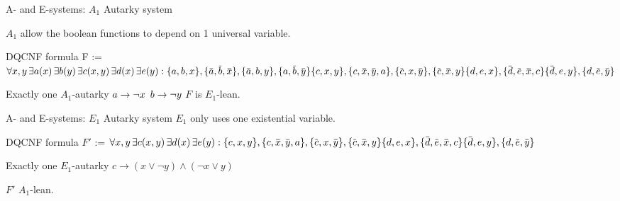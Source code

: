 \documentclass[xcolor=table	]{beamer}
\newcommand{\ov}[1]{\mkern 1.5mu\overline{\mkern-1.5mu#1\mkern-1.5mu}\mkern 1.5mu}
\begin{document}
\begin{frame}{A- and E-systems: $A_1$ Autarky system}

\vspace{0.2cm}
\only
 $A_1$ allow the boolean functions to  
	depend on 1 universal variable. 
	
	\begin{alertblock}{DQCNF formula}
		{		
		F :=	$ \forall x, y \, \exists a(x) \, \exists  b(y) \, \exists c(x,y) \, \exists d(x) \, \exists e(y) :
			\{a,b,x\}, \{\ov{a},\ov{b},\ov{x}\}, \{\ov{a},b,y\}, \{a,\ov{b},\ov{y}\}  \newline 
			\{c,x,y\}, \{c,\ov{x},\ov{y}, a\}, \{\ov{c},x,\ov{y}\}, \{\ov{c},\ov{x},y\} \newline 
			\{d,e,x\}, \{\ov{d},\ov{e},\ov{x}, c\} \{\ov{d},e,y\}, \{d,\ov{e},\ov{y}\} $
		}
	\end{alertblock}
    
    \begin{example}
    	Exactly one $A_1$-autarky \newline 
    	 $a \to \neg x \newline$ 
    	 $b \to \neg y \newline$
    	 $F$ is $E_1$-lean.
    	 
    \end{example}
\end{frame}
    
\begin{frame}{A- and E-systems: $E_1$ Autarky system}
$E_1$ only uses one existential variable. 
\begin{alertblock}{DQCNF formula}
	{		
		$F'$ :=	$ \forall x, y \, \exists c(x,y) \, \exists d(x) \, \exists e(y) : \newline 
		\{c,x,y\}, \{c,\ov{x},\ov{y}, a\}, \{\ov{c},x,\ov{y}\}, \{\ov{c},\ov{x},y\} \newline 
		\{d,e,x\}, \{\ov{d},\ov{e},\ov{x}, c\} \{\ov{d},e,y\}, \{d,\ov{e},\ov{y}\} $
	}
\end{alertblock}

 \begin{example}
	Exactly one $E_1$-autarky \newline 
	$c \to (x \lor \neg y) \land (\neg x \lor y)$
	
	$F'$ $A_1$-lean.
	
\end{example} 

\end{frame}
\end{document}
